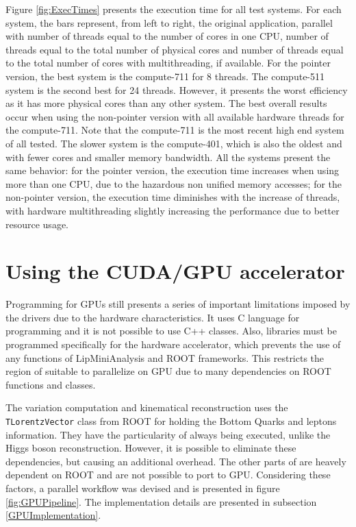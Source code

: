 Figure \ref{fig:ExecTimes} presents the execution time for all test systems. For each system, the bars represent, from left to right, the original application, parallel with number of threads equal to the number of cores in one CPU, number of threads equal to the total number of physical cores and number of threads equal to the total number of cores with multithreading, if available. For the pointer version, the best system is the compute-711 for 8 threads. The compute-511 system is the second best for 24 threads. However, it presents the worst efficiency as it has more physical cores than any other system. The best overall results occur when using the non-pointer version with all available hardware threads for the compute-711. Note that the compute-711 is the most recent high end system of all tested. The slower system is the compute-401, which is also the oldest and with fewer cores and smaller memory bandwidth. All the systems present the same behavior: for the pointer version, the execution time increases when using more than one CPU, due to the hazardous non unified memory accesses; for the non-pointer version, the execution time diminishes with the increase of threads, with hardware multithreading slightly increasing the performance due to better resource usage.

\section{Using the \nvidia CUDA/GPU accelerator}
\label{Parallelization:GPU}

Programming for GPUs still presents a series of important limitations imposed by the drivers due to the hardware characteristics. It uses C language for programming and it is not possible to use C++ classes. Also, libraries must be programmed specifically for the hardware accelerator, which prevents the use of any functions of LipMiniAnalysis and ROOT frameworks. This restricts the region of \ttDilepKinFit suitable to parallelize on GPU due to many dependencies on ROOT functions and classes.

The variation computation and kinematical reconstruction uses the \texttt{TLorentzVector} class from ROOT for holding the Bottom Quarks and leptons information. They have the particularity of always being executed, unlike the Higgs boson reconstruction. However, it is possible to eliminate these dependencies, but causing an additional overhead. The other parts of \ttDilepKinFit are heavely dependent on ROOT and are not possible to port to GPU. Considering these factors, a parallel workflow was devised and is presented in figure \ref{fig:GPUPipeline}. The implementation details are presented in subsection \ref{GPUImplementation}. 

